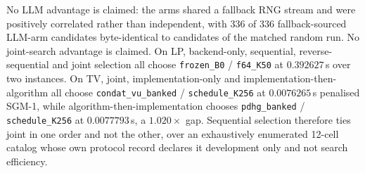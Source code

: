 No LLM advantage is claimed: the arms shared a fallback RNG stream and were
positively correlated rather than independent, with 336 of 336 fallback-sourced
LLM-arm candidates byte-identical to candidates of the matched random run.
No joint-search advantage is claimed. On LP, backend-only, sequential,
reverse-sequential and joint selection all choose \texttt{frozen\_B0} /
\texttt{f64\_K50} at $0.392627$\,s over two instances. On TV, joint,
implementation-only and implementation-then-algorithm all choose
\texttt{condat\_vu\_banked} / \texttt{schedule\_K256} at $0.0076265$\,s
penalised SGM-1, while algorithm-then-implementation chooses
\texttt{pdhg\_banked} / \texttt{schedule\_K256} at $0.0077793$\,s, a
$1.020\times$ gap. Sequential selection therefore ties joint in one order and
not the other, over an exhaustively enumerated 12-cell catalog whose own
protocol record declares it development only and not search efficiency.

